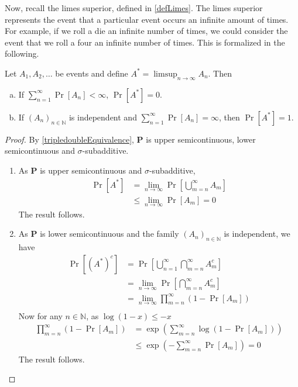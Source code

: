 Now, recall the limes superior, defined in \ref{defLimes}. The limes superior represents the event that a particular event occurs an infinite amount of times. For example, if we roll a die an infinite number of times, we could consider the event that we roll a four an infinite number of times. This is formalized in the following.

\begin{theorem}
\label{borelCantelliLemma}
    Let $A_1,A_2,\ldots$ be events and define $A^*=\limsup_{n\to\infty} A_n$. Then
    \begin{enumerate}[(a)]
        \item If $\sum_{n=1}^\infty \Pr[A_n]<\infty$, $\Pr[A^*]=0$.
        \item If $(A_n)_{n\in\mathbb{N}}$ is independent and $\sum_{n=1}^\infty \Pr[A_n]=\infty$, then $\Pr[A^*]=1$.
    \end{enumerate}
\end{theorem}
\begin{proof}
    By \ref{tripledoubleEquivalence}, $\textbf{P}$ is upper semicontinuous, lower semicontinuous and $\sigma$-subadditive.
    \begin{enumerate}
        \item As $\textbf{P}$ is upper semicontinuous and $\sigma$-subadditive,
        \begin{align*}
            \Pr[A^*] &= \lim_{n\to\infty}\Pr\left[\bigcup_{m=n}^\infty A_m\right] \\
            &\leq \lim_{n\to\infty} \Pr[A_m] = 0
        \end{align*}
        The result follows.
        
        \item As $\textbf{P}$ is lower semicontinuous and the family $(A_n)_{n\in\mathbb{N}}$ is independent, we have
        \begin{align*}
            \Pr[(A^*)^c] &= \Pr\left[\bigcup_{n=1}^\infty\bigcap_{m=n}^\infty A_m^c\right] \\
            &= \lim_{n\to\infty} \Pr\left[\bigcap_{m=n}^\infty A_m^c\right] \\
            &= \lim_{n\to\infty} \prod_{m=n}^\infty \left(1-\Pr[A_m]\right) \\
        \end{align*}
        Now for any $n\in\mathbb{N}$, as $\log(1-x)\leq -x$
        \begin{align*}
            \prod_{m=n}^\infty \left(1-\Pr[A_m]\right)&= \exp\left(\sum_{m=n}^\infty \log(1-\Pr[A_m])\right) \\
            &\leq \exp\left(-\sum_{m=n}^\infty \Pr[A_m]\right) = 0
        \end{align*}
        The result follows.
    \end{enumerate}
\end{proof}

